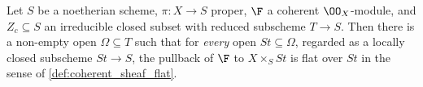 \begin{lemma}

\leanok
  \label{lem:flat_stratum_component}
  Let \(S\) be a noetherian scheme, \(\pi : X \to S\) proper, \(\F\) a
  coherent \(\OO_X\)-module, and \(Z_c \subseteq S\) an irreducible closed
  subset with reduced subscheme \(T \to S\).  Then there is a non-empty open
  \(\Omega \subseteq T\) such that for \emph{every} open
  \(\mathit{St} \subseteq \Omega\), regarded as a locally closed subscheme
  \(\mathit{St} \to S\), the pullback of \(\F\) to
  \(X \times_S \mathit{St}\) is flat over \(\mathit{St}\) in the sense of
  \cref{def:coherent_sheaf_flat}.
\end{lemma}


